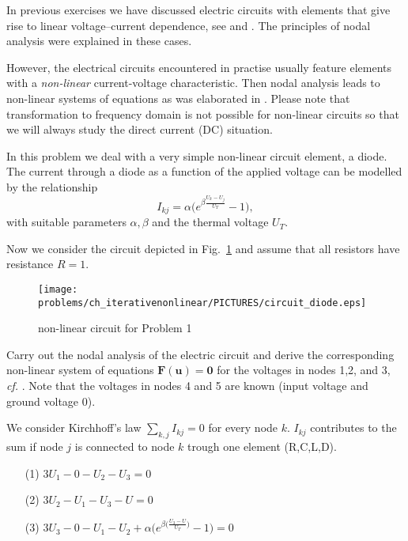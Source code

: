 \begin{problem}
  In previous exercises we have discussed electric circuits with elements that give
  rise to linear voltage--current dependence, see  and .
  The principles of nodal analysis were explained in these cases. 
  
  However, the electrical circuits encountered in practise usually feature elements
  with a \emph{non-linear} current-voltage characteristic. Then nodal analysis
  leads to non-linear systems of equations as was elaborated in .
  Please note that transformation to frequency domain is not possible for
  non-linear circuits so that we will always study the direct current (DC)
  situation. 

  In this problem we deal with a very simple non-linear circuit element, a diode. The
  current through a diode as a function of the applied voltage can be modelled by the
  relationship
  $$I_{kj} = \alpha\Big(e^{\beta\frac{U_k-U_j}{U_T}}-1\Big),$$
  with suitable parameters $\alpha,\beta$ and the thermal voltage $U_{T}$. 

  Now we consider the circuit depicted in Fig.~\ref{fig:circ} and assume that all
  resistors have resistance $R=1$. 

    \begin{figure}
      \centering
      \texttt{[image: \\problems/ch\_iterativenonlinear/PICTURES/circuit\_diode.eps]}
      \caption{non-linear circuit for Problem 1}
      \label{fig:circ}
    \end{figure}
    
  \begin{subproblem}[2]
    Carry out the nodal analysis of the electric circuit and
    derive the corresponding non-linear system of equations
    $\mathbf{F}(\mathbf{u})=\mathbf{0}$ for the voltages in nodes 1,2, and 3,
    \emph{cf.} . Note that the voltages in nodes 4 and 5 are known
    (input voltage and ground voltage 0). 
    \begin{solution}
    We consider Kirchhoff's law $\sum\limits_{k,j} I_{kj} = 0$ for every node $k$. $I_{kj}$ contributes to the sum if node $j$
    is connected to node $k$ trough one element (R,C,L,D).
    
    \begin{itemize}
        \item[(1)] $3U_1 - 0 - U_2 - U_3=0$
        \item[(2)] $3U_2 - U_1 - U_3 - U=0$
        \item[(3)] $3U_3 - 0 - U_1 - U_2+ \alpha\Bigg(e^{\beta\Big(\frac{U_3-U}{U_T} \Big)}-1\Bigg)=0 $
    \end{itemize}
    

\end{solution}
\end{subproblem}
\end{problem}

